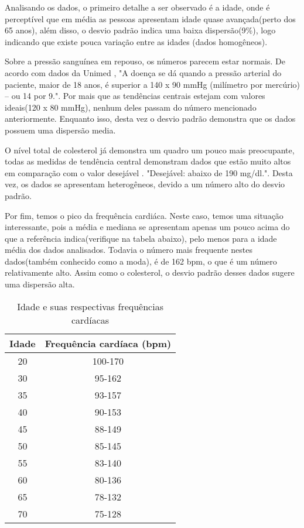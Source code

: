     Analisando os dados, o primeiro detalhe a ser observado é a idade, onde é perceptível que em média
    as pessoas apresentam idade quase avançada(perto dos 65 anos), além disso, o desvio padrão indica 
    uma baixa dispersão(9\%), logo indicando que existe pouca variação entre as idades 
    (dados homogêneos).

    Sobre a pressão sanguínea em repouso, os números parecem estar normais. De acordo com dados da Unimed
    \cite{hipertensao}, "A doença se dá quando a pressão arterial do paciente, maior de 18 anos, é superior
    a 140 x 90 mmHg (milímetro por mercúrio) – ou 14 por 9.". Por mais que as tendências centrais estejam com  
    valores ideais(120 x 80 mmHg), nenhum deles passam do número mencionado anteriormente. Enquanto isso, desta vez o desvio padrão demonstra 
    que os dados possuem uma dispersão media.

    O nível total de colesterol já demonstra um quadro um pouco mais preocupante, todas as medidas 
    de tendência central demonstram dados que estão muito altos em comparação com o valor desejável \cite{colesterol}.
    "Desejável: abaixo de 190 mg/dl.". Desta vez, os dados se apresentam heterogêneos, devido a um número
    alto do desvio padrão.

    Por fim, temos o pico da frequência cardiáca. Neste caso, temos uma situação interessante, pois 
    a média e mediana se apresentam apenas um pouco acima do que a referência indica(verifique na tabela abaixo), pelo 
    menos para a idade média dos dados analisados. Todavia o número mais frequente nestes dados(também conhecido como a moda),
    é de 162 bpm, o que é um número relativamente alto. Assim como o colesterol, o desvio padrão desses dados sugere uma dispersão alta.

    \begin{table}[htb]
      \caption{Idade e suas respectivas frequências cardíacas}
      \centering
        \begin{tabular}{ |c|c|  }
          \hline
          Idade & Frequência cardíaca (bpm) \\
          \hline
          20 & 100-170  \\
          \hline
          30 & 95-162 \\
          \hline
          35 & 93-157 \\
          \hline
          40 & 90-153  \\
          \hline
          45 & 88-149 \\
          \hline
          50 & 85-145  \\
          \hline
          55 & 83-140  \\
          \hline
          60 & 80-136  \\
          \hline
          65 & 78-132  \\
          \hline
          70 & 75-128  \\
          \hline
        \end{tabular}
    \end{table}

    \nocite{frequenciacardiaca}
    \nocite{sobremedidascentrais}
